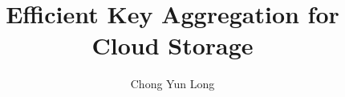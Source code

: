 \documentclass[hyp,a4paper,12pt,openbib]{socreport}
\begin{document}
\title{Efficient Key Aggregation for Cloud Storage}
\author{Chong Yun Long}
\maketitle
\begin{abstract}



\end{abstract}
\end{document}
